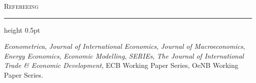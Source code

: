 \documentclass[11pt]{article}
\newcommand{\cvsection}[1]{%
  \vspace{1.1em}\par
  {\large\scshape #1}\par
  \vspace{0.15em}
  \hrule height 0.5pt
  \vspace{0.7em}
}
\begin{document}
\cvsection{Refereeing}
\textit{Econometrica}, \textit{Journal of International Economics}, \textit{Journal of Macroeconomics}, \textit{Energy Economics}, \textit{Economic Modelling}, \textit{SERIEs}, \textit{The Journal of International Trade \& Economic Development}, ECB Working Paper Series, OeNB Working Paper Series.
\end{document}
